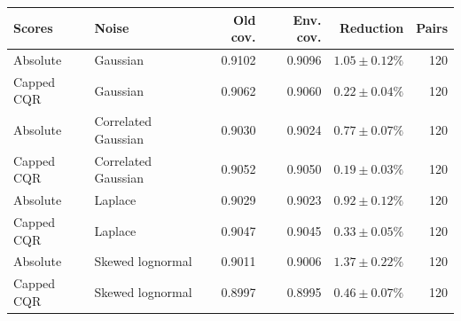 \begin{tabular}{llrrrr}
\toprule
Scores & Noise & Old cov. & Env. cov. & Reduction & Pairs\\
\midrule
Absolute & Gaussian & 0.9102 & 0.9096 & $1.05\pm 0.12\%$ & 120\\
Capped CQR & Gaussian & 0.9062 & 0.9060 & $0.22\pm 0.04\%$ & 120\\
Absolute & Correlated Gaussian & 0.9030 & 0.9024 & $0.77\pm 0.07\%$ & 120\\
Capped CQR & Correlated Gaussian & 0.9052 & 0.9050 & $0.19\pm 0.03\%$ & 120\\
Absolute & Laplace & 0.9029 & 0.9023 & $0.92\pm 0.12\%$ & 120\\
Capped CQR & Laplace & 0.9047 & 0.9045 & $0.33\pm 0.05\%$ & 120\\
Absolute & Skewed lognormal & 0.9011 & 0.9006 & $1.37\pm 0.22\%$ & 120\\
Capped CQR & Skewed lognormal & 0.8997 & 0.8995 & $0.46\pm 0.07\%$ & 120\\
\bottomrule
\end{tabular}
